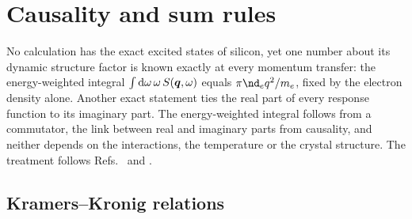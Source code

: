 \section{Causality and sum rules}\label{sec:4.3}

No calculation has the exact excited states of silicon, yet one number about its dynamic structure factor is known exactly at every momentum transfer: the energy-weighted integral $\int\mathrm{d}\omega\,\omega\,S(\bm{q},\omega)$ equals $\pi\nd_eq^2/m_e$, fixed by the electron density alone. Another exact statement ties the real part of every response function to its imaginary part. The energy-weighted integral follows from a commutator, the link between real and imaginary parts from causality, and neither depends on the interactions, the temperature or the crystal structure. The treatment follows Refs.~\cite[Sects.~3.2--3.4]{giuliani2005quantum} and \cite[Chaps.~2 and 3]{pines1966theory}.

\subsection{Kramers--Kronig relations}

